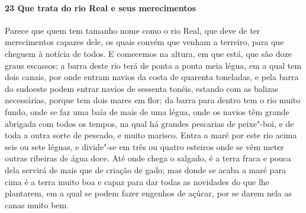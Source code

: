 \begin{linenumbers}
\paragraph{23 Que trata do rio Real e seus merecimentos} \quad
Parece que quem tem tamanho nome como o rio Real, que deve de ter merecimentos capazes
dele, os quais convém que venham a terreiro, para que cheguem à notícia de todos. E
comecemos na altura, em que está, que são doze graus escassos; a barra deste rio terá de
ponta a ponta meia légua, em a qual tem dois canais, por onde entram navios da costa de
quarenta toneladas, e pela barra do sudoeste podem entrar navios de sessenta tonéis,
estando com as balizas necessárias, porque tem dois mares em flor; da barra para dentro
tem o rio muito fundo, onde se faz uma baía de mais de uma légua, onde os navios têm
grande abrigada com todos os tempos, na qual há grandes pescarias de peixe"-boi, e de toda
a outra sorte de pescado, e muito marisco. Entra a maré por este rio acima seis ou sete
léguas, e divide"-se em três ou quatro esteiros onde se vêm meter outras ribeiras de água
doce. Até onde chega o salgado, é a terra fraca e pouca dela servirá de mais que de
criação de gado; mas donde se acaba a maré para cima é a terra muito boa e capaz para dar
todas as novidades do que lhe plantarem, em a qual se podem fazer engenhos de açúcar, por
se darem nela as canas muito bem.


\end{linenumbers}
